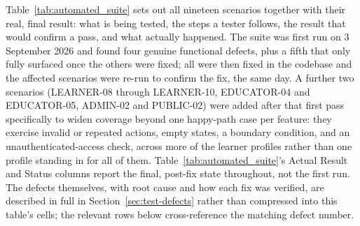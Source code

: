 \documentclass[12pt, oneside]{article} %
\begin{document}
Table~\ref{tab:automated_suite} sets out all nineteen scenarios together with their real, final result: what is being tested, the steps a tester follows, the result that would confirm a pass, and what actually happened. The suite was first run on 3 September 2026 and found four genuine functional defects, plus a fifth that only fully surfaced once the others were fixed; all were then fixed in the codebase and the affected scenarios were re-run to confirm the fix, the same day. A further two scenarios (LEARNER-08 through LEARNER-10, EDUCATOR-04 and EDUCATOR-05, ADMIN-02 and PUBLIC-02) were added after that first pass specifically to widen coverage beyond one happy-path case per feature: they exercise invalid or repeated actions, empty states, a boundary condition, and an unauthenticated-access check, across more of the learner profiles rather than one profile standing in for all of them. Table~\ref{tab:automated_suite}'s Actual Result and Status columns report the final, post-fix state throughout, not the first run. The defects themselves, with root cause and how each fix was verified, are described in full in Section~\ref{sec:test-defects} rather than compressed into this table's cells; the relevant rows below cross-reference the matching defect number.
\end{document}
